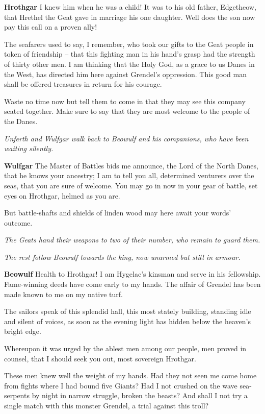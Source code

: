 \documentclass[a4paper]{article}
\begin{document}
{\textbf{Hrothgar} I knew him when he was a child!
It was to his old father, Edgetheow, that
Hrethel the Geat gave in marriage
his one daughter. Well does the son
now pay this call on a proven ally!

 The seafarers used to say, I remember,
who took our gifts to the Geat people
in token of friendship – that this fighting man
in his hand’s grasp had the strength
of thirty other men. I am thinking that
the Holy God, as a grace to us
Danes in the West, has directed him here
against Grendel’s oppression. This good man shall be
offered treasures in return for his courage.

Waste no time now but tell them to come in
that they may see this company seated together.
Make sure to say that they are most welcome
to the people of the Danes.

\centerline{\textit{Unferth and Wulfgar walk back to Beowulf and his companions, who have been waiting silently.}}

\textbf{Wulfgar} The Master of Battles bids me announce,
the Lord of the North Danes, that he knows your ancestry;
I am to tell you all, determined venturers
over the seas, that you are sure of welcome.
You may go in now in your gear of battle,
set eyes on Hrothgar, helmed as you are.

But battle-shafts and shields of linden wood
may here await your words' outcome.

\centerline{\textit{The Geats hand their weapons to two of their number, who remain to guard them.}}
\centerline{\textit{The rest follow Beowulf towards the king, now unarmed but still in armour.}}

\textbf{Beowulf} Health to Hrothgar! I am Hygelac’s kinsman
and serve in his fellowship. Fame-winning deeds
have come early to my hands. The affair of Grendel
has been made known to me on my native turf.

The sailors speak of this splendid hall,
this most stately building, standing idle
and silent of voices, as soon as the evening light
has hidden below the heaven’s bright edge.

Whereupon it was urged by the ablest men
among our people, men proved in counsel,
that I should seek you out, most sovereign Hrothgar.

These men knew well the weight of my hands.
Had they not seen me come home from fights
where I had bound five Giants?
Had I not crushed on the wave
sea-serpents by night in narrow struggle,
broken the beasts? And shall I not try
a single match with this monster Grendel,
a trial against this troll?

}
\end{document}
